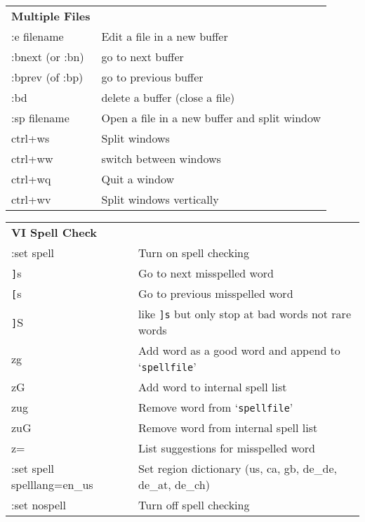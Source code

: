 \documentclass[11pt]{article}
\newcommand{\code}[1]{\texttt{#1}} %
\begin{document}
\bigskip\bigskip

\centering
{}
\begin{tabular}{| l | l |}
  \hline \hline
  \textbf{Multiple Files} & \\
  :e filename      & Edit a file in a new buffer \\
  :bnext (or :bn)  & go to next buffer \\
  :bprev (of :bp)  & go to previous buffer \\
  :bd              & delete a buffer (close a file) \\
  :sp filename     & Open a file in a new buffer and split window \\
  ctrl+ws          & Split windows \\
  ctrl+ww          & switch between windows \\
  ctrl+wq          & Quit a window \\
  ctrl+wv          & Split windows vertically \\
  \hline \hline
\end{tabular}

\bigskip\bigskip

\centering
{}
\begin{tabular}{| l | l |}
  \hline \hline
  \textbf{VI Spell Check} & \\
  :set spell            & Turn on spell checking \\
  \code{]}s             & Go to next misspelled word \\
  \code{[}s             & Go to previous misspelled word \\
  \code{]}S             & like \code{]s} but only stop at bad words not rare words \\
  zg                    & Add word as a good word and append to `\code{spellfile}' \\
  zG                    & Add word to internal spell list \\
  zug                   & Remove word from `\code{spellfile}' \\
  zuG                   & Remove word from internal spell list \\
  z=                    & List suggestions for misspelled word \\
  :set spell spelllang=en\_us  & Set region dictionary (us, ca, gb, de\_de, de\_at, de\_ch) \\
  :set nospell          & Turn off spell checking \\
  \hline \hline
\end{tabular}
\end{document}
